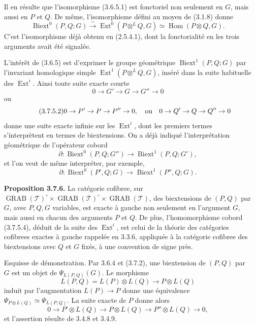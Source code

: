 \documentclass[11pt]{article}
\providecommand{\Hom}{\operatorname{Hom}}
\providecommand{\Ext}{\operatorname{Ext}}
\providecommand{\Biext}{\operatorname{Biext}}
\providecommand{\Ext}{\operatorname{Ext}}
\providecommand{\GRAB}{\operatorname{GRAB}}
\providecommand{\cT}{\mathcal T}
\begin{document}
Il en résulte que l'isomorphisme (3.6.5.1) est fonctoriel non seulement en \(G\), mais aussi en \(P\) et \(Q\).  De même, l'isomorphisme défini au moyen de (3.1.8) donne
\begin{equation}\tag{3.7.4}
 \Biext^0(P,Q;G)\xrightarrow{\sim}
 \Ext^0(P\otimes^L Q,G)\simeq\Hom(P\otimes Q,G).
\end{equation}
C'est l'isomorphisme déjà obtenu en (2.5.4.1), dont la fonctorialité en les trois arguments avait été signalée.

L'intérêt de (3.6.5) est d'exprimer le groupe géométrique \(\Biext^1(P,Q;G)\) par l'invariant homologique simple \(\Ext^1(P\otimes^L Q,G)\), inséré dans la suite habituelle des \(\Ext^i\).  Ainsi toute suite exacte courte
\begin{equation}\tag{3.7.5.1}
        0\to G'\to G\to G''\to0
\end{equation}
ou
\begin{equation}\tag{3.7.5.2}
        0\to P'\to P\to P''\to0,
        \quad\hbox{ou}\quad
        0\to Q'\to Q\to Q''\to0
\end{equation}
donne une suite exacte infinie sur les \(\Ext^i\), dont les premiers termes s'interprètent en termes de biextensions.  On a déjà indiqué l'interprétation géométrique de l'opérateur cobord
\begin{equation}\tag{3.7.5.3}
 \partial:\Biext^0(P,Q;G'')\to\Biext^1(P,Q;G'),
\end{equation}
et l'on veut de même interpréter, par exemple,
\begin{equation}\tag{3.7.5.4}
 \partial:\Biext^0(P',Q;G)\to\Biext^1(P'',Q;G).
\end{equation}

\textbf{Proposition 3.7.6.}  La catégorie cofibree, sur
\(\GRAB(\cT)^{\circ}\times\GRAB(\cT)^{\circ}\times\GRAB(\cT)\), des biextensions de \((P,Q)\) par \(G\), avec \(P,Q,G\) variables, est exacte à gauche non seulement en l'argument \(G\), mais aussi en chacun des arguments \(P\) et \(Q\).  De plus, l'homomorphisme cobord (3.7.5.4), déduit de la suite des \(\Ext^i\), est celui de la théorie des catégories cofibrees exactes à gauche rappelée en 3.3.6, appliquée à la catégorie cofibree des biextensions avec \(Q\) et \(G\) fixés, à une convention de signe près.

Esquisse de démonstration.  Par 3.6.4 et (3.7.2), une biextension de \((P,Q)\) par \(G\) est un objet de \(\Psi_{L(P,Q)}(G)\).  Le morphisme
\[
        L(P,Q)=L(P)\otimes L(Q)\to P\otimes L(Q)
\]
induit par l'augmentation \(L(P)\to P\) donne une équivalence \(\Psi_{P\otimes L(Q)}\simeq\Psi_{L(P,Q)}\).  La suite exacte de \(P\) donne alors
\begin{equation}\tag{3.7.6.1}
        0\to P'\otimes L(Q)\to P\otimes L(Q)\to P''\otimes L(Q)\to0,
\end{equation}
et l'assertion résulte de 3.4.8 et 3.4.9.
\end{document}
